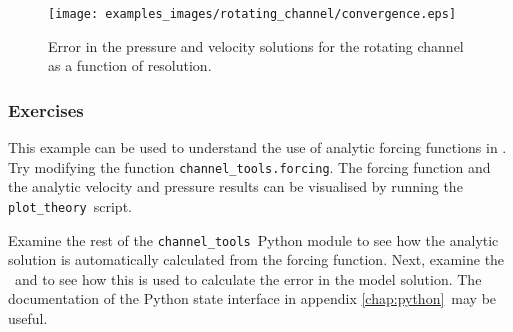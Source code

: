 \begin{figure}[htbp]
  \centering
  \onlypdf{\begin{pdfdisplay}}
    \texttt{[image: examples\_images/rotating\_channel/convergence.eps]}
  \onlypdf{\end{pdfdisplay}}  
  \caption{Error in the pressure and velocity solutions for the rotating channel as a function of resolution.}
  \label{fig:periodic_channel_error}
\end{figure}

\subsubsection{Exercises}

This example can be used to understand the use of analytic forcing
functions in \fluidity. Try modifying the function
\lstinline[language=python]{channel_tools.forcing}. The forcing function
and the analytic velocity and pressure results can be visualised by running
the \lstinline[language=python]{plot_theory}\ script. 

Examine the rest of the \lstinline[language=python]{channel_tools}\ Python
module to see how the analytic solution is automatically calculated from the
forcing function. Next, examine the \
and  to see how this is used to
calculate the error in the model solution. The documentation of the Python
state interface in appendix \ref{chap:python}\ may be useful.

